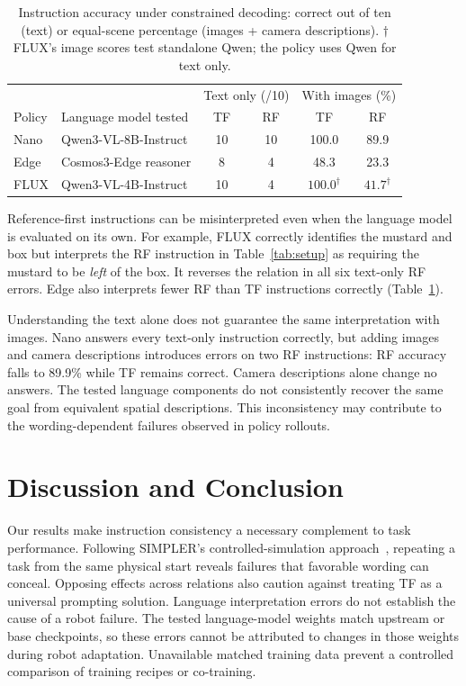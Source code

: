 \documentclass{article}
\begin{document}
\begin{table}[!ht]
\centering\small
\caption{Instruction accuracy under constrained decoding: correct out of ten (text) or equal-scene percentage (images + camera descriptions). $\dagger$ FLUX's image scores test standalone Qwen; the policy uses Qwen for text only.}
\label{tab:vqa}
\begin{tabular}{@{}llcc@{\quad}cc@{}}
\toprule
& & \multicolumn{2}{c}{Text only (/10)} & \multicolumn{2}{c}{With images (\%)}\\
Policy & Language model tested & TF & RF & TF & RF\\
\midrule
Nano & Qwen3-VL-8B-Instruct & 10 & 10 & 100.0 & 89.9\\
Edge & Cosmos3-Edge reasoner & 8 & 4 & 48.3 & 23.3\\
FLUX & Qwen3-VL-4B-Instruct & 10 & 4 & $100.0^\dagger$ & $41.7^\dagger$\\
\bottomrule
\end{tabular}
\end{table}

Reference-first instructions can be misinterpreted even when the language model is evaluated on its own. For example, FLUX correctly identifies the mustard and box but interprets the RF instruction in Table~\ref{tab:setup} as requiring the mustard to be \emph{left} of the box. It reverses the relation in all six text-only RF errors. Edge also interprets fewer RF than TF instructions correctly (Table~\ref{tab:vqa}).

Understanding the text alone does not guarantee the same interpretation with images. Nano answers every text-only instruction correctly, but adding images and camera descriptions introduces errors on two RF instructions: RF accuracy falls to 89.9\% while TF remains correct. Camera descriptions alone change no answers. The tested language components do not consistently recover the same goal from equivalent spatial descriptions. This inconsistency may contribute to the wording-dependent failures observed in policy rollouts.

\section{Discussion and Conclusion}
Our results make instruction consistency a necessary complement to task performance. Following SIMPLER's controlled-simulation approach~\citep{li2025simpler}, repeating a task from the same physical start reveals failures that favorable wording can conceal. Opposing effects across relations also caution against treating TF as a universal prompting solution. Language interpretation errors do not establish the cause of a robot failure. The tested language-model weights match upstream or base checkpoints, so these errors cannot be attributed to changes in those weights during robot adaptation. Unavailable matched training data prevent a controlled comparison of training recipes or co-training.
\end{document}
